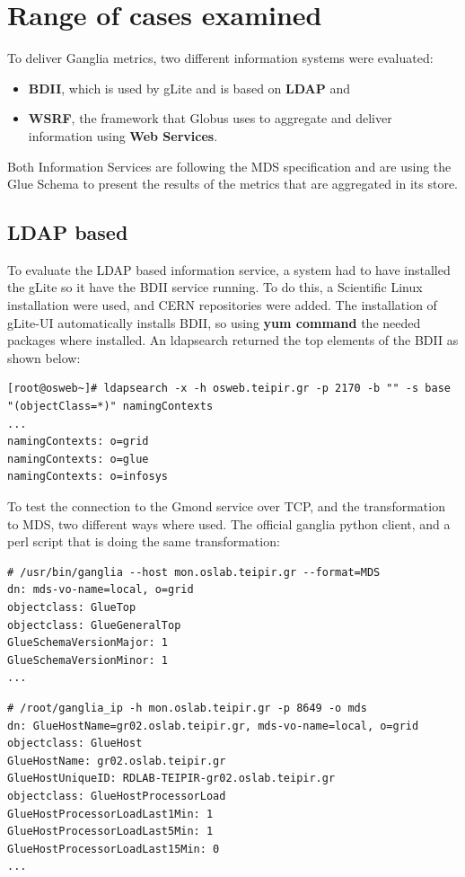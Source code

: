 \section{Range of cases examined}

To deliver Ganglia metrics, two different information systems were evaluated:
\begin{itemize}
  \item {\bf BDII}, which is used by gLite and is based on {\bf LDAP} and
  \item {\bf WSRF}, the framework that Globus uses to aggregate and deliver information using {\bf Web Services}.
\end{itemize}

Both Information Services are following the MDS specification and are using the Glue Schema to present the results of the metrics that are aggregated in its store.

\subsection{LDAP based}

To evaluate the LDAP based information service, a system had to have installed the gLite so it have the BDII service running. To do this, a Scientific Linux installation were used, and CERN repositories were added. The installation of gLite-UI automatically installs BDII, so using {\bf yum command} the needed packages where installed. An ldapsearch returned the top elements of the BDII as shown below:

\begin{lstlisting}
[root@osweb~]# ldapsearch -x -h osweb.teipir.gr -p 2170 -b "" -s base "(objectClass=*)" namingContexts
...
namingContexts: o=grid
namingContexts: o=glue
namingContexts: o=infosys
\end{lstlisting}

To test the connection to the Gmond service over TCP, and the transformation to MDS, two different ways where used. The official ganglia python client, and a perl script that is doing the same transformation:

\begin{lstlisting}
# /usr/bin/ganglia --host mon.oslab.teipir.gr --format=MDS
dn: mds-vo-name=local, o=grid
objectclass: GlueTop
objectclass: GlueGeneralTop
GlueSchemaVersionMajor: 1
GlueSchemaVersionMinor: 1
...
\end{lstlisting}

\begin{lstlisting}
# /root/ganglia_ip -h mon.oslab.teipir.gr -p 8649 -o mds
dn: GlueHostName=gr02.oslab.teipir.gr, mds-vo-name=local, o=grid
objectclass: GlueHost
GlueHostName: gr02.oslab.teipir.gr
GlueHostUniqueID: RDLAB-TEIPIR-gr02.oslab.teipir.gr
objectclass: GlueHostProcessorLoad
GlueHostProcessorLoadLast1Min: 1
GlueHostProcessorLoadLast5Min: 1
GlueHostProcessorLoadLast15Min: 0
...
\end{lstlisting}

